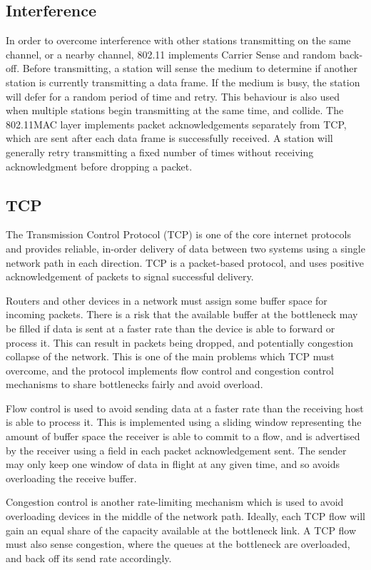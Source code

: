 \documentclass[12pt,a4paper]{article}
\begin{document}
\subsection{Interference}
In order to overcome interference with other stations transmitting on the same
channel, or a nearby channel, 802.11 implements Carrier Sense and random
back-off. Before transmitting, a station will sense the medium to determine if
another station is currently transmitting a data frame. If the medium is busy,
the station will defer for a random period of time and retry. This behaviour is
also used when multiple stations begin transmitting at the same time, and
collide. The 802.11MAC layer implements packet acknowledgements separately from
TCP, which are sent after each data frame is successfully received. A station
will generally retry transmitting a fixed number of times without receiving
acknowledgment before dropping a packet.

\subsection{TCP}
The Transmission Control Protocol (TCP) is one of the core internet protocols
and provides reliable, in-order delivery of data between two systems using a
single network path in each direction. TCP is a packet-based protocol, and uses
positive acknowledgement of packets to signal successful delivery.

Routers and other devices in a network must assign some buffer space for
incoming packets. There is a risk that the available buffer at the bottleneck
may be filled if data is sent at a faster rate than the device is able to
forward or process it. This can result in packets being dropped, and potentially
congestion collapse of the network. This is one of the main problems which TCP
must overcome, and the protocol implements flow control and congestion control
mechanisms to share bottlenecks fairly and avoid overload.

Flow control is used to avoid sending data at a faster rate than the receiving
host is able to process it. This is implemented using a sliding window
representing the amount of buffer space the receiver is able to commit to a
flow, and is advertised by the receiver using a field in each packet
acknowledgement sent. The sender may only keep one window of data in flight at
any given time, and so avoids overloading the receive buffer.

Congestion control is another rate-limiting mechanism which is used to avoid
overloading devices in the middle of the network path. Ideally, each TCP flow
will gain an equal share of the capacity available at the bottleneck link. A TCP
flow must also sense congestion, where the queues at the bottleneck are
overloaded, and back off its send rate accordingly.
\end{document}
